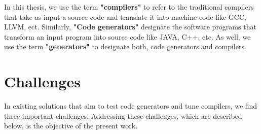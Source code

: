 In this thesis, we use the term \textbf{"compilers"} to refer to the traditional compilers that take as input a source code and translate it into machine code like GCC, LLVM, ect. Similarly, \textbf{"Code generators"} designate the software programs that transform an input program into source code like JAVA, C++, etc. As well, we use the term \textbf{"generators"} to designate both, code generators and compilers. 

\section{Challenges}
In existing solutions that aim to test code generators and tune compilers, we find three important challenges. Addressing these challenges, which are described below, is the objective of the present work.
